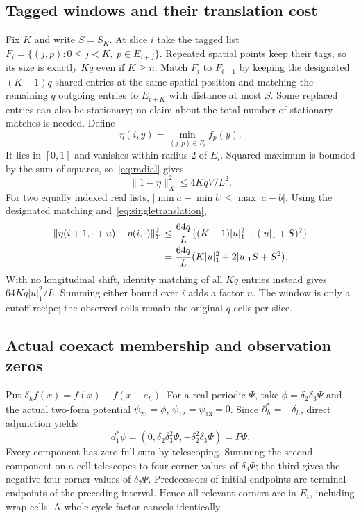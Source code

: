 \documentclass[11pt,a4paper]{article}
\newcommand{\norm}[1]{\lVert#1\rVert}
\begin{document}
\subsection{Tagged windows and their translation cost}
Fix $K$ and write $S=S_K$. At slice $i$ take the tagged list
$F_i=\{(j,p):0\leq j<K,\ p\in E_{i+j}\}$. Repeated spatial points keep
their tags, so its size is exactly $Kq$ even if $K\geq n$.
Match $F_i$ to $F_{i+1}$ by keeping the designated $(K-1)q$ shared entries
at the same spatial position and matching the remaining $q$ outgoing
entries to $E_{i+K}$ with distance at most $S$. Some replaced entries can
also be stationary; no claim about the total number of stationary matches
is needed. Define
\[
 \eta(i,y)=\min_{(j,p)\in F_i} f_p(y).
\]
It lies in $[0,1]$ and vanishes within radius 2 of $E_i$. Squared maximum
is bounded by the sum of squares, so~\eqref{eq:radial} gives
\begin{equation}\label{eq:etadeficit}
 \norm{1-\eta}_X^2\leq 4KqV/L^2.
\end{equation}
For two equally indexed real lists, $|\min a-\min b|\leq\max|a-b|$.
Using the designated matching and~\eqref{eq:singletranslation},
\begin{align}\label{eq:movingtranslation}
 \norm{\eta(i+1,\cdot+u)-\eta(i,\cdot)}_Y^2
 &\leq\frac{64q}{L}\{(K-1)|u|_1^2+(|u|_1+S)^2\}\notag\\
 &=\frac{64q}{L}(K|u|_1^2+2|u|_1S+S^2).
\end{align}
With no longitudinal shift, identity matching of all $Kq$ entries instead
gives $64Kq|u|_1^2/L$. Summing either bound over $i$ adds a factor $n$.
The window is only a cutoff recipe; the observed cells remain the original
$q$ cells per slice.

\subsection{Actual coexact membership and observation zeros}
Put $\delta_h f(x)=f(x)-f(x-e_h)$. For a real periodic $\Psi$, take
$\phi=\delta_2\delta_3\Psi$ and the actual two-form potential
$\psi_{23}=\phi$, $\psi_{12}=\psi_{13}=0$. Since
$\partial_h^*=-\delta_h$, direct adjunction yields
\[
 d_1^*\psi=(0,\delta_2\delta_3^2\Psi,-\delta_2^2\delta_3\Psi)=P\Psi.
\]
Every component has zero full sum by telescoping. Summing the second
component on a cell telescopes to four corner values of $\delta_3\Psi$;
the third gives the negative four corner values of $\delta_2\Psi$.
Predecessors of initial endpoints are terminal endpoints of the preceding
interval. Hence all relevant corners are in $E_i$, including wrap cells.
A whole-cycle factor cancels identically.
\end{document}
